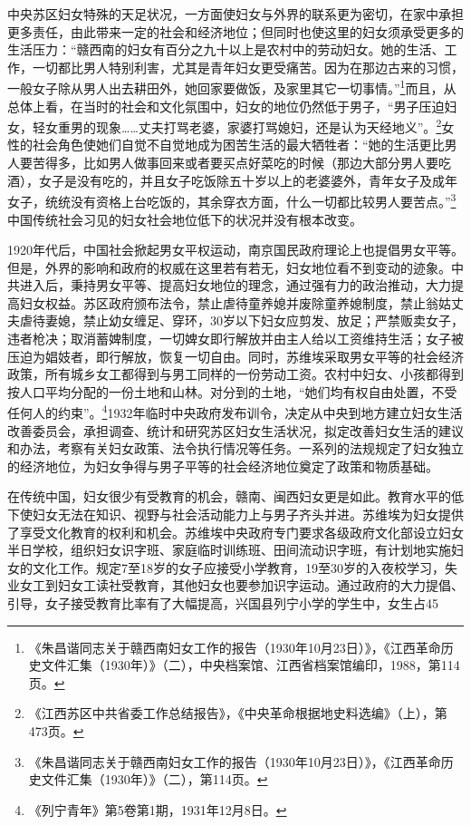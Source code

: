 中央苏区妇女特殊的天足状况，一方面使妇女与外界的联系更为密切，在家中承担更多责任，由此带来一定的社会和经济地位；但同时也使这里的妇女须承受更多的生活压力：“赣西南的妇女有百分之九十以上是农村中的劳动妇女。她的生活、工作，一切都比男人特别利害，尤其是青年妇女更受痛苦。因为在那边古来的习惯，一般女子除从男人出去耕田外，她回家要做饭，及家里其它一切事情。”\footnote{《朱昌谐同志关于赣西南妇女工作的报告（1930年10月23日）》，《江西革命历史文件汇集（1930年）》（二），中央档案馆、江西省档案馆编印，1988，第114页。}而且，从总体上看，在当时的社会和文化氛围中，妇女的地位仍然低于男子，“男子压迫妇女，轻女重男的现象……丈夫打骂老婆，家婆打骂媳妇，还是认为天经地义”。\footnote{《江西苏区中共省委工作总结报告》，《中央革命根据地史料选编》（上），第473页。}女性的社会角色使她们自觉不自觉地成为困苦生活的最大牺牲者：“她的生活更比男人要苦得多，比如男人做事回来或者要买点好菜吃的时候（那边大部分男人要吃酒），女子是没有吃的，并且女子吃饭除五十岁以上的老婆婆外，青年女子及成年女子，统统没有资格上台吃饭的，其余穿衣方面，什么一切都比较男人要苦点。”\footnote{《朱昌谐同志关于赣西南妇女工作的报告（1930年10月23日）》，《江西革命历史文件汇集（1930年）》（二），第114页。}中国传统社会习见的妇女社会地位低下的状况并没有根本改变。


1920年代后，中国社会掀起男女平权运动，南京国民政府理论上也提倡男女平等。但是，外界的影响和政府的权威在这里若有若无，妇女地位看不到变动的迹象。中共进入后，秉持男女平等、提高妇女地位的理念，通过强有力的政治推动，大力提高妇女权益。苏区政府颁布法令，禁止虐待童养媳并废除童养媳制度，禁止翁姑丈夫虐待妻媳，禁止幼女缠足、穿环，30岁以下妇女应剪发、放足；严禁贩卖女子，违者枪决；取消蓄婢制度，一切婢女即行解放并由主人给以工资维持生活；女子被压迫为娼妓者，即行解放，恢复一切自由。同时，苏维埃采取男女平等的社会经济政策，所有城乡女工都得到与男工同样的一份劳动工资。农村中妇女、小孩都得到按人口平均分配的一份土地和山林。对分到的土地，“她们均有权自由处置，不受任何人的约束”。\footnote{《列宁青年》第5卷第1期，1931年12月8日。}1932年临时中央政府发布训令，决定从中央到地方建立妇女生活改善委员会，承担调查、统计和研究苏区妇女生活状况，拟定改善妇女生活的建议和办法，考察有关妇女政策、法令执行情况等任务。一系列的法规规定了妇女独立的经济地位，为妇女争得与男子平等的社会经济地位奠定了政策和物质基础。


在传统中国，妇女很少有受教育的机会，赣南、闽西妇女更是如此。教育水平的低下使妇女无法在知识、视野与社会活动能力上与男子齐头并进。苏维埃为妇女提供了享受文化教育的权利和机会。苏维埃中央政府专门要求各级政府文化部设立妇女半日学校，组织妇女识字班、家庭临时训练班、田间流动识字班，有计划地实施妇女的文化工作。规定7至18岁的女子应接受小学教育，19至30岁的入夜校学习，失业女工到妇女工读社受教育，其他妇女也要参加识字运动。通过政府的大力提倡、引导，女子接受教育比率有了大幅提高，兴国县列宁小学的学生中，女生占45%


